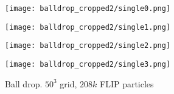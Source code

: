 \begin{figure}[H]
    \centering
    
    \begin{minipage}[t]{.42\linewidth}
        \centering
        \vspace{0pt}
        \texttt{[image: balldrop\_cropped2/single0.png]}
    \end{minipage}
    \begin{minipage}[t]{.42\linewidth}
        \centering
        \vspace{0pt}
        \texttt{[image: balldrop\_cropped2/single1.png]}
    \end{minipage}

    \vspace{0.5cm}

    \begin{minipage}[t]{.42\linewidth}
        \centering
        \vspace{0pt}
        \texttt{[image: balldrop\_cropped2/single2.png]}
    \end{minipage}
    \begin{minipage}[t]{.42\linewidth}
        \centering
        \vspace{0pt}
        \texttt{[image: balldrop\_cropped2/single3.png]}
    \end{minipage}

    \caption{Ball drop. $50^3$ grid, $208k$ FLIP particles}
    \label{figure ball drop single}
\end{figure}

\newpage
\thispagestyle{empty}
\vspace*{-4cm}


